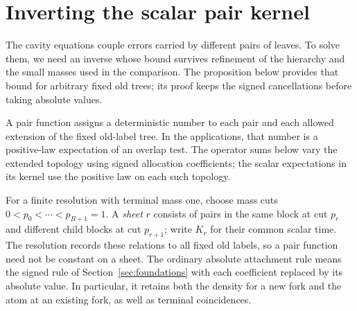 \section{Inverting the scalar pair kernel}
\label{sec:inverse}

The cavity equations couple errors carried by different pairs of
leaves. To solve them, we need an inverse whose bound survives refinement
of the hierarchy and the small masses used in the comparison. The
proposition below provides that bound for arbitrary fixed old trees;
its proof keeps the signed cancellations before taking absolute values.

A pair function assigns a deterministic number to each pair and each
allowed extension of the fixed old-label tree. In the applications,
that number is a positive-law expectation of an overlap test. The
operator sums below vary the extended topology using signed allocation
coefficients; the scalar expectations in its kernel use the positive
law on each such topology.

For a finite resolution with terminal mass one, choose mass cuts
\(0<p_0<\cdots<p_{R+1}=1\). A \emph{sheet} \(r\) consists of
pairs in the same block at cut \(p_r\) and different child blocks
at cut \(p_{r+1}\); write \(K_r\) for their common scalar time.
The resolution records these relations to all fixed old labels, so a
pair function need not be constant on a sheet. The ordinary absolute
attachment rule means the signed rule of Section~\ref{sec:foundations}
with each coefficient replaced by its absolute value. In particular,
it retains both the density for a new fork and the atom at an existing
fork, as well as terminal coincidences.

